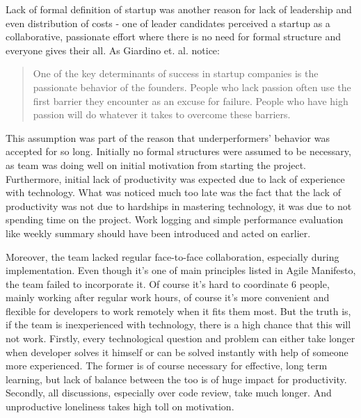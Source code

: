 \documentclass{article}
\begin{document}
Lack of formal definition of startup \citep{paternoster2014software} was another reason for lack of leadership and even distribution of costs - one of leader candidates perceived a startup as a collaborative, passionate effort where there is no need for formal structure and everyone gives their all. As Giardino et. al. \citep{giardino2014early} notice:
\begin{quote}
  One of the key determinants of success in startup companies is the passionate behavior of the founders. People who lack passion often use the first barrier they encounter as an excuse for failure. People who have high passion will do whatever it takes to overcome these barriers.
\end{quote}

This assumption was part of the reason that underperformers' behavior was accepted for so long. Initially no formal structures were assumed to be necessary, as team was doing well on initial motivation from starting the project. Furthermore, initial lack of productivity was expected due to lack of experience with technology. What was noticed much too late was the fact that the lack of productivity was not due to hardships in mastering technology, it was due to not spending time on the project. Work logging and simple performance evaluation like weekly summary should have been introduced and acted on earlier.

Moreover, the team lacked regular face-to-face collaboration, especially during implementation. Even though it's one of main principles listed in Agile Manifesto, the team failed to incorporate it. Of course it's hard to coordinate 6 people, mainly working after regular work hours, of course it's more convenient and flexible for developers to work remotely when it fits them most. But the truth is, if the team is inexperienced with technology, there is a high chance that this will not work. Firstly, every technological question and problem can either take longer when developer solves it himself or can be solved instantly with help of someone more experienced. The former is of course necessary for effective, long term learning, but lack of balance between the too is of huge impact for productivity. Secondly, all discussions, especially over code review, take much longer. And unproductive loneliness takes high toll on motivation.
\end{document}
